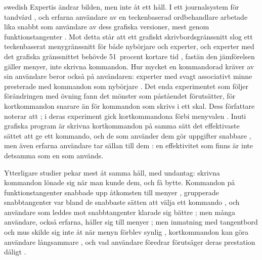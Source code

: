 \begin{onlyin}{swedish}
Expertis ändrar bilden, men inte åt ett håll.  I ett journalsystem för
tandvård , och erfarna användare av en teckenbaserad
ordbehandlare arbetade lika snabbt som användare av dess grafiska
versioner, mest genom funktionstangenter
\autocite{dYdewalle1995Graphical}.  Mot detta står att ett grafiskt
skrivbordsgränssnitt slog ett teckenbaserat menygränssnitt för både
nybörjare och experter, och experter med det grafiska gränssnittet
behövde 51~procent kortare tid \autocite{Rauterberg1992Empirical},
fastän den jämförelsen gäller menyer, inte skrivna kommandon.  Hur
mycket en kommandorad kräver av sin användare beror också på användaren:
experter med svagt associativt minne presterade med kommandon som
nybörjare \autocite{Westerman1997Individual}.  Det enda experimentet som
följer förändringen med övning fann det mönster som påståendet
förutsätter, för kortkommandon snarare än för kommandon som skrivs i ett
skal.  Dess författare
noterar att ; i deras experiment gick
kortkommandona förbi menyvalen
.  Inuti grafiska program är skrivna kortkommandon på samma
sätt det effektivaste sättet att ge ett kommando, och de som använder
dem gör uppgifter snabbare \autocite{Jardina2009Keyboard}, men även
erfarna användare tar sällan till dem
\autocite{Lane2005Hidden,Tak2013Satisficing}: en effektivitet som finns
är inte detsamma som en som används.

Ytterligare studier pekar mest åt samma håll, med undantag: skrivna
kommandon lönade sig när man kunde dem, och få bytte.  Kommandon på
funktionstangenter snabbade upp
åtkomsten till menyer \autocite{Hammontree1991Communicating}, grupperade
snabbtangenter var bland de snabbaste sätten att välja ett kommando
\autocite{Odell2004Toolglasses}, och användare som leddes mot
snabbtangenter klarade sig bättre \autocite{Scarr2011Dips}; men många
användare, också erfarna, håller sig till menyer
\autocite{Giannisakis2019Promoting}; men inmatning med tangentbord och mus
skilde sig inte åt när menyn förblev synlig \autocite{Davies1989Effects},
kortkommandon kan göra användare långsammare \autocite{Howes2000Trouble},
och vad användare föredrar förutsäger deras prestation dåligt
\autocite{Heasly1988Comparative}.


\end{onlyin}
